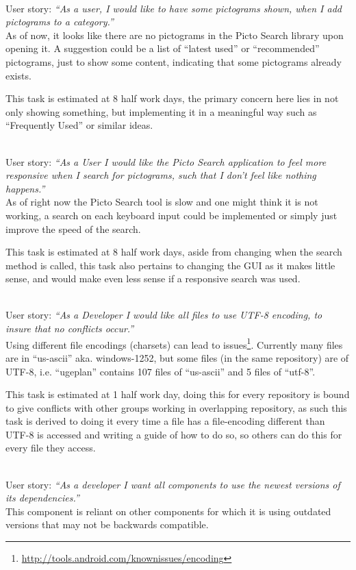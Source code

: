 \begin{description}[style=unboxed]
    \item[Picto Search - It looks like there are no pictograms, until you search for them] \hfill \\ 
        User story: \textit{``As a user, I would like to have some pictograms shown, when I add pictograms to a category.''}\\
        As of now, it looks like there are no pictograms in the Picto Search library upon opening it. 
        A suggestion could be a list of ``latest used'' or ``recommended'' pictograms, just to show some content, indicating that some pictograms already exists.

        This task is estimated at 8 half work days, the primary concern here lies in not only showing something, but implementing it in a meaningful way such as ``Frequently Used'' or similar ideas.
    \item[Picto Search - Responsive Search] \hfill \\
        User story: \textit{``As a User I would like the Picto Search application to feel more responsive when I search for pictograms, such that I don't feel like nothing happens.''} \\
        As of right now the Picto Search tool is slow and one might think it is not working, a search on each keyboard input could be implemented or simply just improve the speed of the search.

        This task is estimated at 8 half work days, aside from changing when the search method is called, this task also pertains to changing the GUI as it makes little sense, and would make even less sense if a responsive search was used.
    \item[General - Use consistent file encoding] \hfill \\
        User story: \textit{``As a Developer I would like all files to use UTF-8 encoding, to insure that no conflicts occur.''} \\
        Using different file encodings (charsets) can lead to issues\footnote{\url{http://tools.android.com/knownissues/encoding}}. 
        Currently many files are in ``us-ascii'' aka. windows-1252, but some files (in the same repository) are of UTF-8, i.e. ``ugeplan'' contains 107 files of ``us-ascii'' and 5 files of ``utf-8''.    

        This task is estimated at 1 half work day, doing this for every repository is bound to give conflicts with other groups working in overlapping repository, as such this task is derived to doing it every time a file has a file-encoding different than UTF-8 is accessed and writing a guide of how to do so, so others can do this for every file they access.
    \item[SequenceViewer - Update dependencies] \hfill \\
        User story: \textit{``As a developer I want all components to use the newest versions of its dependencies.''} \\
        This component is reliant on other components for which it is using outdated versions that may not be backwards compatible.


\end{description}
